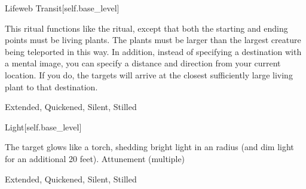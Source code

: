 \begin{spellsection}{Lifeweb Transit}[self.base_level]
\begin{spellcontent}
\begin{spelltargetinginfo}
\end{spelltargetinginfo}
\begin{spelleffects}
\spelleffect
This ritual functions like the  ritual, except that both the starting and ending points must be living plants.
The plants must be larger than the largest creature being teleported in this way.
In addition, instead of specifying a destination with a mental image, you can specify a distance and direction from your current location.
If you do, the targets will arrive at the closest sufficiently large living plant to that destination.
\end{spelleffects}
\end{spellcontent}
\begin{spellfooter}
 Extended, Quickened, Silent, Stilled
\end{spellfooter}
\begin{spellsubcontent}
\end{spellsubcontent}
\end{spellsection}
\begin{spellsection}{Light}[self.base_level]
\begin{spellcontent}
\begin{spelltargetinginfo}
\end{spelltargetinginfo}
\begin{spelleffects}
\spelleffect
The target glows like a torch, shedding bright light in an \areamed radius (and dim light for an additional 20 feet).
\spelldur Attunement (multiple)
\end{spelleffects}
\end{spellcontent}
\begin{spellfooter}
 Extended, Quickened, Silent, Stilled
\end{spellfooter}
\begin{spellsubcontent}
\end{spellsubcontent}
\end{spellsection}
